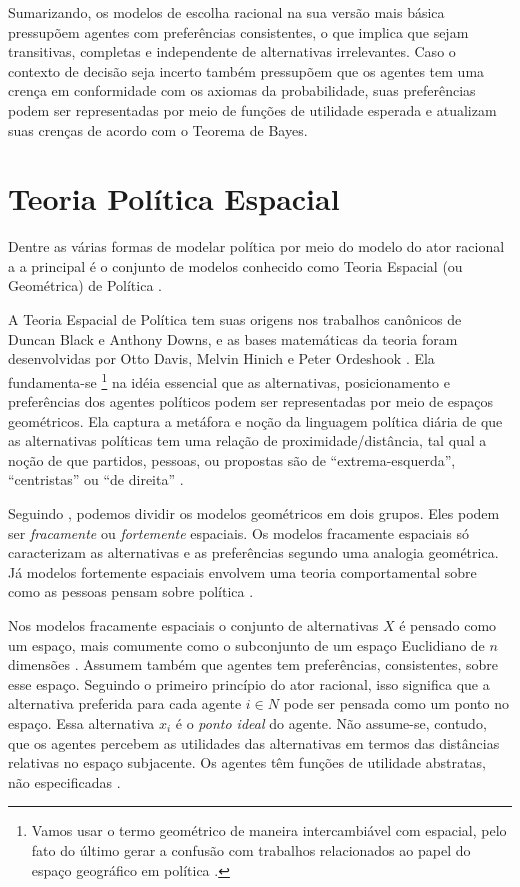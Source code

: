 Sumarizando, os modelos de escolha racional na sua versão mais básica pressupõem
agentes com preferências consistentes, o que implica que sejam transitivas,
completas e independente de alternativas irrelevantes. Caso o contexto de
decisão seja incerto também pressupõem que os agentes tem uma crença em
conformidade com os axiomas da probabilidade, suas preferências podem ser
representadas por meio de funções de utilidade esperada e atualizam suas crenças
de acordo com o Teorema de Bayes.


\section{Teoria Política Espacial}

Dentre as várias formas de modelar política por meio do modelo do ator racional
a a principal é o conjunto de modelos conhecido como Teoria Espacial (ou
Geométrica) de Política \cite{van2005political}.

A Teoria Espacial de Política tem suas origens nos trabalhos canônicos de Duncan
Black e Anthony Downs, e as bases matemáticas da teoria foram desenvolvidas por
Otto Davis, Melvin Hinich e Peter Ordeshook \cite{black1958theory,
  downs1957economic, poole2005spatial, miller2015spatial}. Ela fundamenta-se
\footnote{Vamos usar o termo geométrico de maneira intercambiável com espacial,
  pelo fato do último gerar a confusão com trabalhos relacionados ao papel do
  espaço geográfico em política \cite{ward2002spatial, poole2005spatial}.} na
idéia essencial que as alternativas, posicionamento e preferências dos agentes
políticos podem ser representadas por meio de espaços geométricos. Ela captura a
metáfora e noção da linguagem política diária de que as alternativas políticas
tem uma relação de proximidade/distância, tal qual a noção de que partidos,
pessoas, ou propostas são de ``extrema-esquerda'', ``centristas'' ou ``de
direita'' \cite{munger2015choosing}.


Seguindo , podemos dividir os modelos
geométricos em dois grupos. Eles podem ser \textit{fracamente} ou
\textit{fortemente} espaciais. Os modelos fracamente espaciais só caracterizam
as alternativas e as preferências segundo uma analogia geométrica. Já modelos
fortemente espaciais envolvem uma teoria comportamental sobre como as pessoas
pensam sobre política \cite{laver2014measuring}.


Nos modelos fracamente espaciais o conjunto de alternativas \(X\) é pensado como
um espaço, mais comumente como o subconjunto de um espaço Euclidiano de \(n\)
dimensões \cite{austen1998social}. Assumem também que agentes tem preferências,
consistentes, sobre esse espaço. Seguindo o primeiro princípio do ator racional,
isso significa que a alternativa preferida para cada agente \(i \in N\) pode ser
pensada como um ponto no espaço. Essa alternativa $x_i$ é o \textit{ponto ideal}
do agente. Não assume-se, contudo, que os agentes percebem as utilidades das
alternativas em termos das distâncias relativas no espaço subjacente. Os agentes
têm funções de utilidade abstratas, não especificadas
\cite[p.14]{humphreys2010spatial}.

